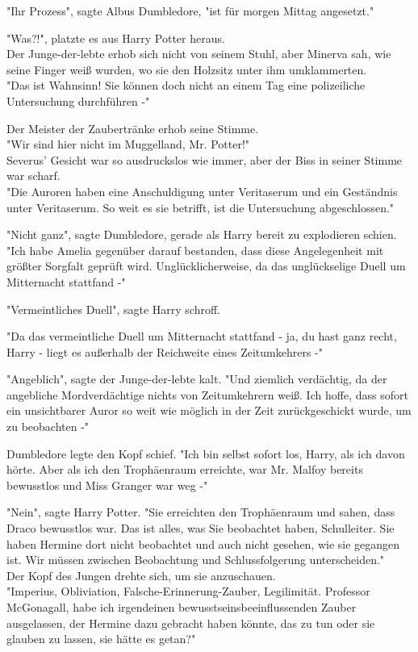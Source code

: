 {"Ihr Prozess", sagte Albus Dumbledore, "ist für morgen Mittag angesetzt."

"Was?!", platzte es aus Harry Potter heraus.\\ Der Junge-der-lebte erhob sich nicht von seinem Stuhl, aber Minerva sah, wie seine Finger weiß wurden, wo sie den Holzsitz unter ihm umklammerten.\\ "Das ist Wahnsinn! Sie können doch nicht an einem Tag eine polizeiliche Untersuchung durchführen -"

Der Meister der Zaubertränke erhob seine Stimme.\\ "Wir sind hier nicht im Muggelland, Mr. Potter!"\\ Severus' Gesicht war so ausdruckslos wie immer, aber der Biss in seiner Stimme war scharf.\\ "Die Auroren haben eine Anschuldigung unter Veritaserum und ein Geständnis unter Veritaserum. So weit es sie betrifft, ist die Untersuchung abgeschlossen."

"Nicht ganz", sagte Dumbledore, gerade als Harry bereit zu explodieren schien. "Ich habe Amelia gegenüber darauf bestanden, dass diese Angelegenheit mit größter Sorgfalt geprüft wird. Unglücklicherweise, da das unglückselige Duell um Mitternacht stattfand -"

"Vermeintliches Duell", sagte Harry schroff.

"Da das vermeintliche Duell um Mitternacht stattfand - ja, du hast ganz recht, Harry - liegt es außerhalb der Reichweite eines Zeitumkehrers -"

"Angeblich", sagte der Junge-der-lebte kalt. "Und ziemlich verdächtig, da der angebliche Mordverdächtige nichts von Zeitumkehrern weiß. Ich hoffe, dass sofort ein unsichtbarer Auror so weit wie möglich in der Zeit zurückgeschickt wurde, um zu beobachten -"

Dumbledore legte den Kopf schief. "Ich bin selbst sofort los, Harry, als ich davon hörte. Aber als ich den Trophäenraum erreichte, war Mr. Malfoy bereits bewusstlos und Miss Granger war weg -"

"Nein", sagte Harry Potter. "Sie erreichten den Trophäenraum und sahen, dass Draco bewusstlos war. Das ist alles, was Sie beobachtet haben, Schulleiter. Sie haben Hermine dort nicht beobachtet und auch nicht gesehen, wie sie gegangen ist. Wir müssen zwischen Beobachtung und Schlussfolgerung unterscheiden."\\ Der Kopf des Jungen drehte sich, um sie anzuschauen.\\ "Imperius, Obliviation, Falsche-Erinnerung-Zauber, Legilimität. Professor McGonagall, habe ich irgendeinen bewusstseinsbeeinflussenden Zauber ausgelassen, der Hermine dazu gebracht haben könnte, das zu tun oder sie glauben zu lassen, sie hätte es getan?"

}
